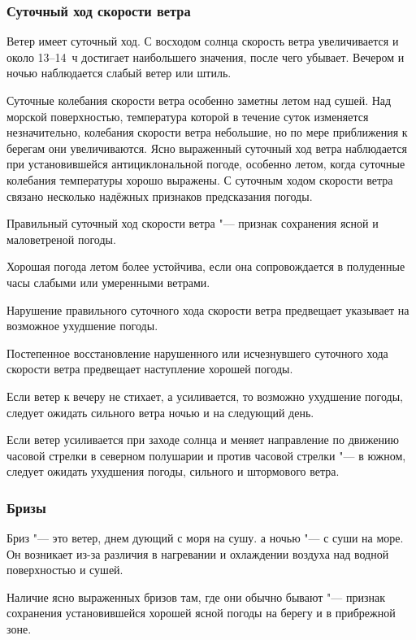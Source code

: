 \subsubsection{Суточный ход скорости ветра}

Ветер имеет суточный ход. С восходом солнца скорость ветра
увеличивается и около 13--14~ч достигает наибольшего значения, после
чего убывает. Вечером и ночью наблюдается слабый ветер или штиль.

Суточные колебания скорости ветра особенно заметны летом над
сушей. Над морской поверхностью, температура которой в течение суток
изменяется незначительно, колебания скорости ветра небольшие, но по
мере приближения к берегам они увеличиваются. Ясно выраженный суточный
ход ветра наблюдается при установившейся антициклональной погоде,
особенно летом, когда суточные колебания температуры хорошо
выражены. С суточным ходом скорости ветра связано несколько надёжных
признаков предсказания погоды.

 Правильный суточный ход скорости ветра "--- признак сохранения ясной и маловетреной погоды.

 Хорошая погода летом более устойчива, если она сопровождается
в полуденные часы слабыми или умеренными ветрами.

 Нарушение правильного суточного хода скорости ветра предвещает
указывает на возможное ухудшение погоды.

 Постепенное восстановление нарушенного или исчезнувшего
суточного хода скорости ветра предвещает наступление хорошей погоды.

 Если ветер к вечеру не стихает, а усиливается, то возможно
ухудшение погоды, следует ожидать сильного ветра ночью и на следующий
день.

 Если ветер усиливается при заходе солнца и меняет направление
по движению часовой стрелки в северном полушарии и против часовой
стрелки "--- в южном, следует ожидать ухудшения погоды, сильного и
штормового ветра.

\subsubsection{Бризы}

Бриз "--- это ветер, днем дующий с моря на сушу. а ночью "--- с суши на
море. Он возникает из-за различия в нагревании и охлаждении воздуха
над водной поверхностью и сушей.

 Наличие ясно выраженных бризов там, где они обычно бывают "---
признак сохранения установившейся хорошей ясной погоды на берегу и в
прибрежной зоне.

